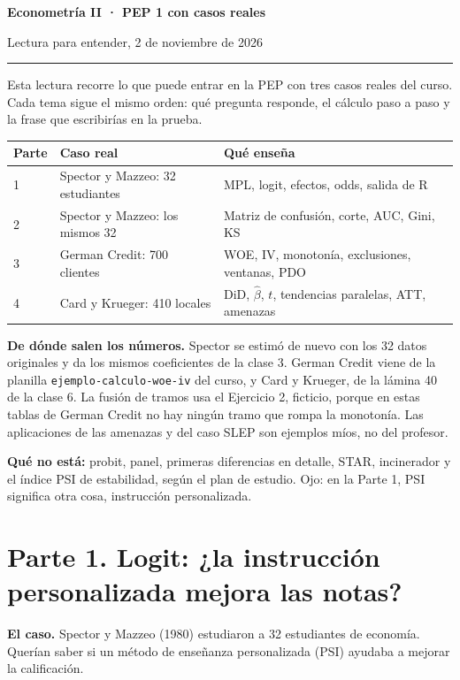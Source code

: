 \documentclass[11pt,letterpaper]{article}
\newcommand{\parte}[1]{\section*{\textcolor{azul}{#1}}}
\begin{document}
\renewcommand{\%}{\ifmmode\mathchar"0025 \else\char37 \fi}

{\LARGE\textbf{Econometría II · PEP 1 con casos reales}}\par
\vspace{2pt}Lectura para entender, 2 de noviembre de 2026\par
\vspace{2pt}\hrule\vspace{8pt}

Esta lectura recorre lo que puede entrar en la PEP con tres casos reales del curso. Cada tema sigue el mismo orden: qué pregunta responde, el cálculo paso a paso y la frase que escribirías en la prueba.

\begin{center}
\begin{tabular}{lll}
\toprule
\textbf{Parte} & \textbf{Caso real} & \textbf{Qué enseña} \\
\midrule
1 & Spector y Mazzeo: 32 estudiantes & MPL, logit, efectos, odds, salida de R \\
2 & Spector y Mazzeo: los mismos 32 & Matriz de confusión, corte, AUC, Gini, KS \\
3 & German Credit: 700 clientes & WOE, IV, monotonía, exclusiones, ventanas, PDO \\
4 & Card y Krueger: 410 locales & DiD, $\hat\beta$, $t$, tendencias paralelas, ATT, amenazas \\
\bottomrule
\end{tabular}
\end{center}

\textbf{De dónde salen los números.} Spector se estimó de nuevo con los 32 datos originales y da los mismos coeficientes de la clase 3. German Credit viene de la planilla \texttt{ejemplo-calculo-woe-iv} del curso, y Card y Krueger, de la lámina 40 de la clase 6. La fusión de tramos usa el Ejercicio 2, ficticio, porque en estas tablas de German Credit no hay ningún tramo que rompa la monotonía. Las aplicaciones de las amenazas y del caso SLEP son ejemplos míos, no del profesor.

\textbf{Qué no está:} probit, panel, primeras diferencias en detalle, STAR, incinerador y el índice PSI de estabilidad, según el plan de estudio. Ojo: en la Parte 1, PSI significa otra cosa, instrucción personalizada.

\parte{Parte 1. Logit: ¿la instrucción personalizada mejora las notas?}

\textbf{El caso.} Spector y Mazzeo (1980) estudiaron a 32 estudiantes de economía. Querían saber si un método de enseñanza personalizada (PSI) ayudaba a mejorar la calificación.
\end{document}
